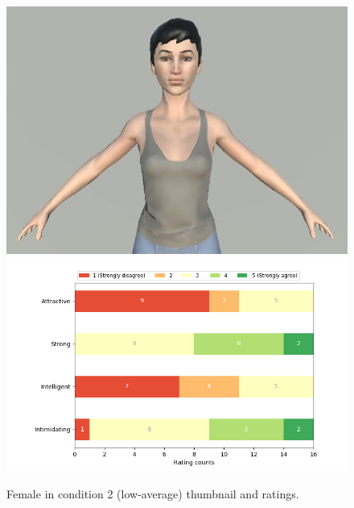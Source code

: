 \begin{figure}[H]
  \includegraphics[width=\linewidth]{Images/Females/16.JPG}
\endminipage\hfill
{}
  \includegraphics[width=\linewidth]{Survey/avatar_f_experiment2.png}
\endminipage\hfill
\caption{Female in condition 2 (low-average) thumbnail and ratings.}
\end{figure}


